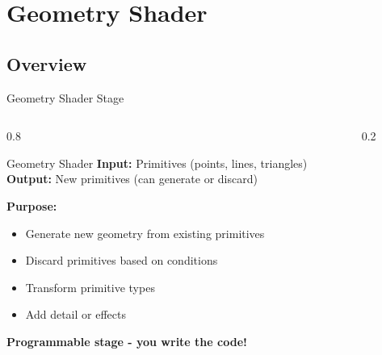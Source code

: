 \section{Geometry Shader}

\subsection{Overview}
\begin{frame}{Geometry Shader Stage}
  \begin{columns}
    \small
    \begin{column}{0.8\textwidth}
      \begin{raybox}{Geometry Shader}
        \textbf{Input:} Primitives (points, lines, triangles) \\
        \textbf{Output:} New primitives (can generate or discard)

        \vspace{0.3cm}
        \textbf{Purpose:}
        \begin{itemize}
          \item Generate new geometry from existing primitives
          \item Discard primitives based on conditions
          \item Transform primitive types
          \item Add detail or effects
        \end{itemize}

        \vspace{0.2cm}
        \textcolor{PrimaryColor}{\textbf{Programmable stage - you write the code!}}
      \end{raybox}
    \end{column}
    \begin{column}{0.2\textwidth}
    \end{column}
  \end{columns}
\end{frame}

